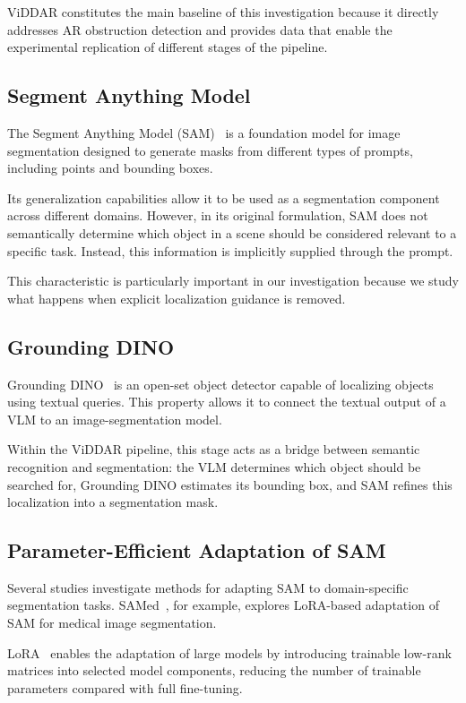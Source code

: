 \documentclass[conference]{IEEEtran}
\begin{document}
ViDDAR constitutes the main baseline of this investigation because it directly addresses AR obstruction detection and provides data that enable the experimental replication of different stages of the pipeline.

\subsection{Segment Anything Model}

The Segment Anything Model (SAM)~\cite{sam} is a foundation model for image segmentation designed to generate masks from different types of prompts, including points and bounding boxes.

Its generalization capabilities allow it to be used as a segmentation component across different domains. However, in its original formulation, SAM does not semantically determine which object in a scene should be considered relevant to a specific task. Instead, this information is implicitly supplied through the prompt.

This characteristic is particularly important in our investigation because we study what happens when explicit localization guidance is removed.

\subsection{Grounding DINO}

Grounding DINO~\cite{groundingdino} is an open-set object detector capable of localizing objects using textual queries. This property allows it to connect the textual output of a VLM to an image-segmentation model.

Within the ViDDAR pipeline, this stage acts as a bridge between semantic recognition and segmentation: the VLM determines which object should be searched for, Grounding DINO estimates its bounding box, and SAM refines this localization into a segmentation mask.

\subsection{Parameter-Efficient Adaptation of SAM}

Several studies investigate methods for adapting SAM to domain-specific segmentation tasks. SAMed~\cite{samed}, for example, explores LoRA-based adaptation of SAM for medical image segmentation.

LoRA~\cite{lora} enables the adaptation of large models by introducing trainable low-rank matrices into selected model components, reducing the number of trainable parameters compared with full fine-tuning.
\end{document}

